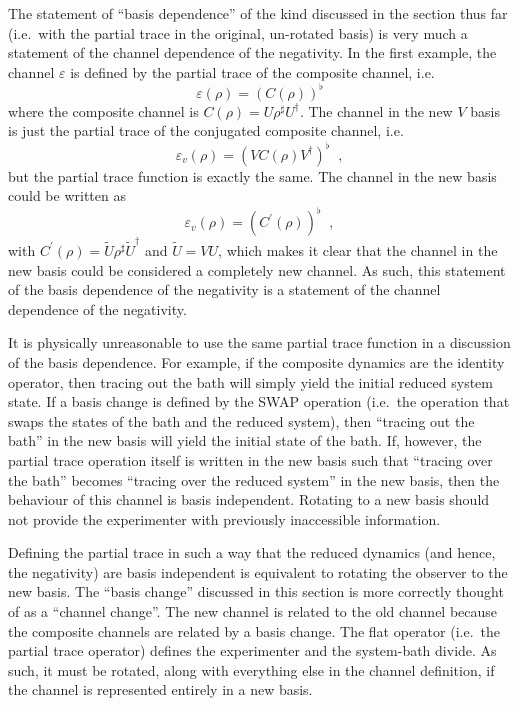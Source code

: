 The statement of ``basis dependence'' of the kind discussed in the section thus far (i.e.\ with the partial trace in the original, un-rotated basis) is very much a statement of the channel dependence of the negativity.  In the first example, the channel $\varepsilon$ is defined by the partial trace of the composite channel, i.e.\
$$
\varepsilon(\rho) = \left(C(\rho)\right)^\flat
$$
where the composite channel is $C(\rho) = U\rho^\sharp U^\dagger$.  The channel in the new $V$ basis is just the partial trace of the conjugated composite channel, i.e.\
$$
\varepsilon_v(\rho) = \left(VC(\rho)V^\dagger\right)^\flat\;\;,
$$
but the partial trace function is exactly the same.  The channel in the new basis could be written as 
$$
\varepsilon_v(\rho) = \left(C^\prime(\rho)\right)^\flat\;\;,
$$
with $C^\prime(\rho) = \tilde{U}\rho^\sharp \tilde{U}^\dagger$ and $\tilde{U}=VU$, which makes it clear that the channel in the new basis could be considered a completely new channel.  As such, this statement of the basis dependence of the negativity is a statement of the channel dependence of the negativity.

It is physically unreasonable to use the same partial trace function in a discussion of the basis dependence.  For example, if the composite dynamics are the identity operator, then tracing out the bath will simply yield the initial reduced system state.  If a basis change is defined by the SWAP operation (i.e.\ the operation that swaps the states of the bath and the reduced system), then ``tracing out the bath'' in the new basis will yield the initial state of the bath.  If, however, the partial trace operation itself is written in the new basis such that ``tracing over the bath'' becomes ``tracing over the reduced system'' in the new basis, then the behaviour of this channel is basis independent.  Rotating to a new basis should not provide the experimenter with previously inaccessible information.  

Defining the partial trace in such a way that the reduced dynamics (and hence, the negativity) are basis independent is equivalent to rotating the observer to the new basis.  The ``basis change'' discussed in this section is more correctly thought of as a ``channel change''.  The new channel is related to the old channel because the composite channels are related by a basis change.  The flat operator (i.e.\ the partial trace operator) defines the experimenter and the system-bath divide.  As such, it must be rotated, along with everything else in the channel definition, if the channel is represented entirely in a new basis.  

